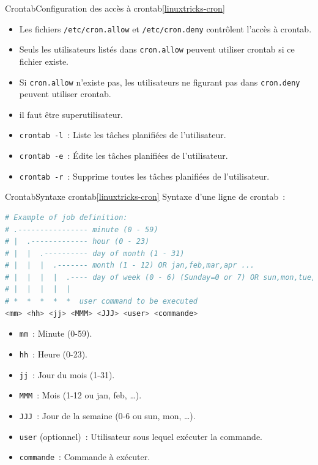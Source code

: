 \documentclass{beamer}
\begin{document}
    \begin{frame}{Crontab}{Configuration des accès à crontab\cref{linuxtricks-cron}}
        \begin{itemize}
            \item Les fichiers \lstinline{/etc/cron.allow} et \lstinline{/etc/cron.deny} contrôlent l'accès à crontab.
            \item Seuls les utilisateurs listés dans \lstinline{cron.allow} peuvent utiliser crontab si ce fichier existe.
            \item Si \lstinline{cron.allow} n'existe pas, les utilisateurs ne figurant pas dans \lstinline{cron.deny} peuvent utiliser crontab.
            \item il faut être superutilisateur.
            \item \lstinline{crontab -l}~: Liste les tâches planifiées de l'utilisateur.
            \item \lstinline{crontab -e}~: Édite les tâches planifiées de l'utilisateur.
            \item \lstinline{crontab -r}~: Supprime toutes les tâches planifiées de l'utilisateur.
        \end{itemize}
    \end{frame}

    \begin{frame}[fragile]{Crontab}{Syntaxe crontab\cref{linuxtricks-cron}}
        Syntaxe d'une ligne de crontab~:
        \begin{lstlisting}[language=bash]
# Example of job definition:
# .---------------- minute (0 - 59)
# |  .------------- hour (0 - 23)
# |  |  .---------- day of month (1 - 31)
# |  |  |  .------- month (1 - 12) OR jan,feb,mar,apr ...
# |  |  |  |  .---- day of week (0 - 6) (Sunday=0 or 7) OR sun,mon,tue,wed,thu,fri,sat
# |  |  |  |  |
# *  *  *  *  *  user command to be executed
<mm> <hh> <jj> <MMM> <JJJ> <user> <commande>
        \end{lstlisting}
        \begin{itemize}
            \item \lstinline{mm}~: Minute (0-59).
            \item \lstinline{hh}~: Heure (0-23).
            \item \lstinline{jj}~: Jour du mois (1-31).
            \item \lstinline{MMM}~: Mois (1-12 ou jan, feb, \ldots).
            \item \lstinline{JJJ}~: Jour de la semaine (0-6 ou sun, mon, \ldots).
            \item \lstinline{user} (optionnel)~: Utilisateur sous lequel exécuter la commande.
            \item \lstinline{commande}~: Commande à exécuter.
        \end{itemize}
    \end{frame}
\end{document}
